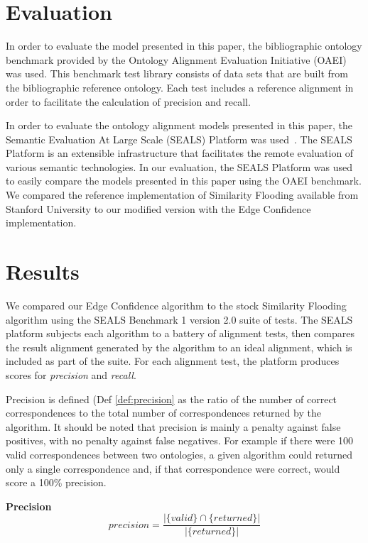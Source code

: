 \documentclass[letterpaper,twocolumn,12pt]{article}
\begin{document}
\section{Evaluation}
\label{sec:eval}

In order to evaluate the model presented in this paper, the bibliographic ontology benchmark provided by 
the Ontology Alignment Evaluation Initiative (OAEI) was used.
This benchmark test library consists of data sets that are built from the bibliographic reference ontology.
Each test includes a reference alignment in order to facilitate the calculation of precision and recall.

In order to evaluate the ontology alignment models presented in this paper, the Semantic Evaluation 
At Large Scale (SEALS) Platform was used~\cite{esteban:2010:executing, wrigley:2010:evaluating}.
The SEALS Platform is an extensible infrastructure that facilitates the remote evaluation of various semantic technologies.
In our evaluation, the SEALS Platform was used to easily compare the models presented in this paper using the OAEI benchmark.
We compared the reference implementation of Similarity Flooding available from Stanford University
to our modified version with the Edge Confidence implementation.


\section{Results}
\label{sec:results}
We compared our Edge Confidence algorithm to the stock Similarity Flooding algorithm using the SEALS Benchmark 1 version 2.0 suite of tests. 
The SEALS platform subjects each algorithm to a battery of alignment tests, then compares the result alignment generated by the algorithm to an ideal alignment, which is included as part of the suite.
For each alignment test, the platform produces scores for \textit{precision} and \textit{recall}.

Precision is defined (Def \ref{def:precision} as the ratio of the number of correct correspondences to the total number of correspondences returned by the algorithm. It should be noted that precision is mainly a penalty against false positives, with no penalty against false negatives. 
For example if there were 100 valid correspondences between two ontologies, a given algorithm could returned only a single correspondence and, if that correspondence were correct, would score a 100\% precision. 

\begin{defn}
\textbf{Precision}
\label{def:precision}
$$
	precision = \frac{|\{valid \} \cap  \{returned \}|}{|\{returned \}|}
$$
\end{defn}
\end{document}
